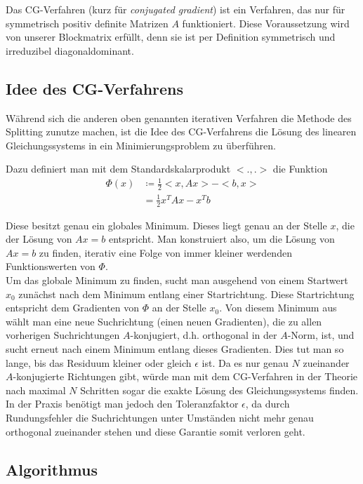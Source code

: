 \documentclass{scrartcl}
\begin{document}
Das CG-Verfahren (kurz für \textit{conjugated gradient}) ist ein Verfahren, das nur für symmetrisch positiv definite Matrizen $A$ funktioniert.
Diese Voraussetzung wird von unserer Blockmatrix erfüllt, denn sie ist per Definition symmetrisch und irreduzibel diagonaldominant.

\subsection{Idee des CG-Verfahrens}

Während sich die anderen oben genannten iterativen Verfahren die Methode des Splitting zunutze machen, ist die Idee des CG-Verfahrens die Lösung des linearen Gleichungssystems in ein Minimierungsproblem zu überführen.

Dazu definiert man mit dem Standardskalarprodukt $<.,.>$ die Funktion
\begin{align*}
  \Phi (x) &\coloneqq \frac{1}{2}<x,Ax> - <b,x>\\
           &=\frac{1}{2}x^T Ax - x^T b
\end{align*}

Diese besitzt genau ein globales Minimum. Dieses liegt genau an der Stelle $x$, die der Lösung von $Ax=b$ entspricht. Man konstruiert also, um die Lösung von $Ax=b$ zu finden, iterativ eine Folge von immer kleiner werdenden Funktionswerten von $\Phi$.\\

Um das globale Minimum zu finden, sucht man ausgehend von einem Startwert $x_0$ zunächst nach dem Minimum entlang einer Startrichtung. Diese Startrichtung entspricht dem Gradienten von $\Phi$ an der Stelle $x_0$.
Von diesem Minimum aus wählt man eine neue Suchrichtung (einen neuen Gradienten), die zu allen vorherigen Suchrichtungen $A$-konjugiert, d.h. orthogonal in der $A$-Norm, ist, und sucht erneut nach einem Minimum entlang dieses Gradienten.
Dies tut man so lange, bis das Residuum kleiner oder gleich $\epsilon$ ist.
Da es nur genau $N$ zueinander $A$-konjugierte Richtungen gibt, würde man mit dem CG-Verfahren in der Theorie nach maximal $N$ Schritten sogar die exakte Lösung des Gleichungssystems finden.
In der Praxis benötigt man jedoch den Toleranzfaktor $\epsilon$, da durch Rundungsfehler die Suchrichtungen unter Umständen nicht mehr genau orthogonal zueinander stehen und diese Garantie somit verloren geht.\\

\subsection{Algorithmus}
\end{document}
